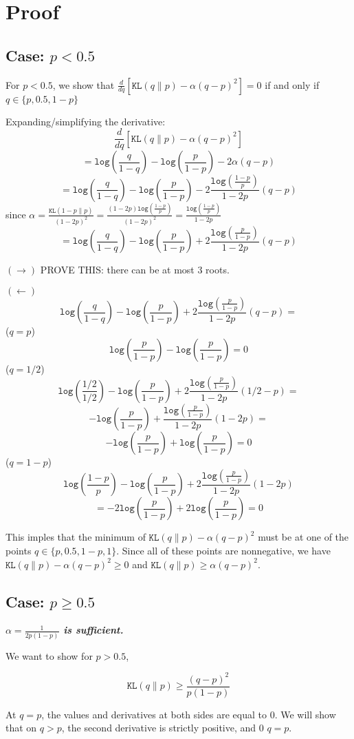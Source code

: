 \documentclass{article}
\newcommand{\kl}[2] { \texttt{KL}(#1 \| #2) }
\newcommand{\logfrac}[2] { \texttt{log}\left(\frac{#1}{#2}\right)  }
\newcommand{\dq} { \frac{d}{dq}  }
\begin{document}
\section{Proof}
\subsection{Case: $p < 0.5$}

For $p < 0.5$, we show that $\dq \left[ \kl{q}{p} -  \alpha(q-p)^2 \right] = 0$ if and only if
$q \in \{p,0.5,1-p\}$

Expanding/simplifying the derivative: 
$$\dq \left[ \kl{q}{p} -  \alpha(q-p)^2 \right]$$ 
$$ = \logfrac{q}{1-q} - \logfrac{p}{1-p} - 2\alpha(q-p)$$
$$ = \logfrac{q}{1-q} - \logfrac{p}{1-p} - 2\frac{\logfrac{1-p}{p}}{1-2p}(q-p)$$
since $\alpha = \frac{\kl{1-p}{p}}{(1-2p)^2} = \frac{(1-2p)\logfrac{1-p}{p}}{(1-2p)^2} = \frac{\logfrac{1-p}{p}}{1-2p}$
$$ = \logfrac{q}{1-q} - \logfrac{p}{1-p} + 2\frac{\logfrac{p}{1-p}}{1-2p}(q-p)$$

$(\rightarrow)$ PROVE THIS: there can be at most 3 roots.  

$(\leftarrow)$ 
$$\logfrac{q}{1-q} - \logfrac{p}{1-p} + 2\frac{\logfrac{p}{1-p}}{1-2p}(q-p) = $$
($q=p$)
$$\logfrac{p}{1-p} - \logfrac{p}{1-p} = 0$$
($q=1/2$)
$$\logfrac{1/2}{1/2} - \logfrac{p}{1-p} + 2\frac{\logfrac{p}{1-p}}{1-2p}(1/2-p) = $$
$$-\logfrac{p}{1-p} + \frac{\logfrac{p}{1-p}}{1-2p}(1-2p) = $$
$$-\logfrac{p}{1-p} + \logfrac{p}{1-p} = 0$$
($q=1-p$)
$$\logfrac{1-p}{p} - \logfrac{p}{1-p} + 2\frac{\logfrac{p}{1-p}}{1-2p}(1-2p)$$
$$ = -2\logfrac{p}{1-p} + 2\logfrac{p}{1-p} = 0$$

This imples that the minimum of $\kl{q}{p} -  \alpha(q-p)^2$ must be at one of the points $q \in \{p,0.5,1-p,1\}$.  Since all of these points are nonnegative, we have $\kl{q}{p} -  \alpha(q-p)^2 \geq 0$ and $\kl{q}{p} \geq \alpha(q-p)^2$.  

\subsection{Case: $p \geq 0.5$}
\textbf{\textit{$\alpha = \frac{1}{2p(1-p)}$ is sufficient.}}

We want to show for $p > 0.5$, 

$$\kl{q}{p} \geq \frac{(q-p)^2}{p(1-p)}$$  

At $q=p$, the values and derivatives at both sides are equal to 0.  We will show that on $q > p$, the second derivative is strictly positive, and 0 $q=p$.  
\end{document}
